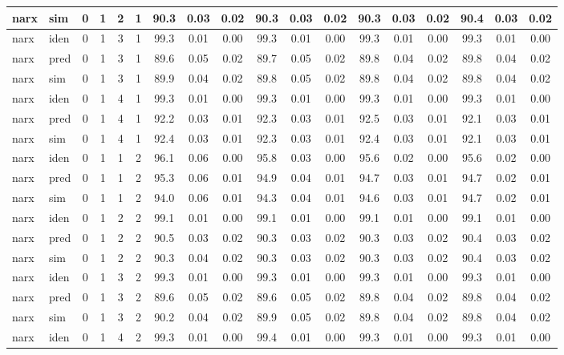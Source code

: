 \begin{landscape}
\begin{center}
\begin{longtable}{ll|cccc|ccc|ccc|ccc|ccc}
narx & sim  & 0 & 1 & 2 & 1 & 90.3 & 0.03 & 0.02 & 90.3 & 0.03 & 0.02 & 90.3 & 0.03 & 0.02 & 90.4 & 0.03 & 0.02 \\ 
 \hline 
narx & iden & 0 & 1 & 3 & 1 & 99.3 & 0.01 & 0.00 & 99.3 & 0.01 & 0.00 & 99.3 & 0.01 & 0.00 & 99.3 & 0.01 & 0.00 \\ 
narx & pred & 0 & 1 & 3 & 1 & 89.6 & 0.05 & 0.02 & 89.7 & 0.05 & 0.02 & 89.8 & 0.04 & 0.02 & 89.8 & 0.04 & 0.02 \\ 
narx & sim  & 0 & 1 & 3 & 1 & 89.9 & 0.04 & 0.02 & 89.8 & 0.05 & 0.02 & 89.8 & 0.04 & 0.02 & 89.8 & 0.04 & 0.02 \\ 
 \hline 
narx & iden & 0 & 1 & 4 & 1 & 99.3 & 0.01 & 0.00 & 99.3 & 0.01 & 0.00 & 99.3 & 0.01 & 0.00 & 99.3 & 0.01 & 0.00 \\ 
narx & pred & 0 & 1 & 4 & 1 & 92.2 & 0.03 & 0.01 & 92.3 & 0.03 & 0.01 & 92.5 & 0.03 & 0.01 & 92.1 & 0.03 & 0.01 \\ 
narx & sim  & 0 & 1 & 4 & 1 & 92.4 & 0.03 & 0.01 & 92.3 & 0.03 & 0.01 & 92.4 & 0.03 & 0.01 & 92.1 & 0.03 & 0.01 \\ 
 \hline 
narx & iden & 0 & 1 & 1 & 2 & 96.1 & 0.06 & 0.00 & 95.8 & 0.03 & 0.00 & 95.6 & 0.02 & 0.00 & 95.6 & 0.02 & 0.00 \\ 
narx & pred & 0 & 1 & 1 & 2 & 95.3 & 0.06 & 0.01 & 94.9 & 0.04 & 0.01 & 94.7 & 0.03 & 0.01 & 94.7 & 0.02 & 0.01 \\ 
narx & sim  & 0 & 1 & 1 & 2 & 94.0 & 0.06 & 0.01 & 94.3 & 0.04 & 0.01 & 94.6 & 0.03 & 0.01 & 94.7 & 0.02 & 0.01 \\ 
 \hline 
narx & iden & 0 & 1 & 2 & 2 & 99.1 & 0.01 & 0.00 & 99.1 & 0.01 & 0.00 & 99.1 & 0.01 & 0.00 & 99.1 & 0.01 & 0.00 \\ 
narx & pred & 0 & 1 & 2 & 2 & 90.5 & 0.03 & 0.02 & 90.3 & 0.03 & 0.02 & 90.3 & 0.03 & 0.02 & 90.4 & 0.03 & 0.02 \\ 
narx & sim  & 0 & 1 & 2 & 2 & 90.3 & 0.04 & 0.02 & 90.3 & 0.03 & 0.02 & 90.3 & 0.03 & 0.02 & 90.4 & 0.03 & 0.02 \\ 
 \hline 
narx & iden & 0 & 1 & 3 & 2 & 99.3 & 0.01 & 0.00 & 99.3 & 0.01 & 0.00 & 99.3 & 0.01 & 0.00 & 99.3 & 0.01 & 0.00 \\ 
narx & pred & 0 & 1 & 3 & 2 & 89.6 & 0.05 & 0.02 & 89.6 & 0.05 & 0.02 & 89.8 & 0.04 & 0.02 & 89.8 & 0.04 & 0.02 \\ 
narx & sim  & 0 & 1 & 3 & 2 & 90.2 & 0.04 & 0.02 & 89.9 & 0.05 & 0.02 & 89.8 & 0.04 & 0.02 & 89.8 & 0.04 & 0.02 \\ 
 \hline 
narx & iden & 0 & 1 & 4 & 2 & 99.3 & 0.01 & 0.00 & 99.4 & 0.01 & 0.00 & 99.3 & 0.01 & 0.00 & 99.3 & 0.01 & 0.00 \\ 

\end{longtable}
\end{center}
\end{landscape}
